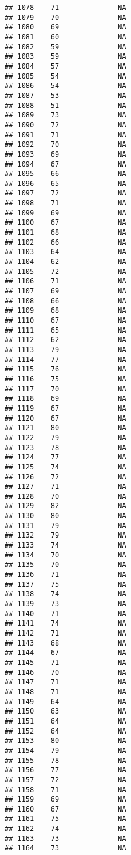 \documentclass[]{article}
\begin{document}
\begin{verbatim}
## 1078    71              NA
## 1079    70              NA
## 1080    69              NA
## 1081    60              NA
## 1082    59              NA
## 1083    59              NA
## 1084    57              NA
## 1085    54              NA
## 1086    54              NA
## 1087    53              NA
## 1088    51              NA
## 1089    73              NA
## 1090    72              NA
## 1091    71              NA
## 1092    70              NA
## 1093    69              NA
## 1094    67              NA
## 1095    66              NA
## 1096    65              NA
## 1097    72              NA
## 1098    71              NA
## 1099    69              NA
## 1100    67              NA
## 1101    68              NA
## 1102    66              NA
## 1103    64              NA
## 1104    62              NA
## 1105    72              NA
## 1106    71              NA
## 1107    69              NA
## 1108    66              NA
## 1109    68              NA
## 1110    67              NA
## 1111    65              NA
## 1112    62              NA
## 1113    79              NA
## 1114    77              NA
## 1115    76              NA
## 1116    75              NA
## 1117    70              NA
## 1118    69              NA
## 1119    67              NA
## 1120    67              NA
## 1121    80              NA
## 1122    79              NA
## 1123    78              NA
## 1124    77              NA
## 1125    74              NA
## 1126    72              NA
## 1127    71              NA
## 1128    70              NA
## 1129    82              NA
## 1130    80              NA
## 1131    79              NA
## 1132    79              NA
## 1133    74              NA
## 1134    70              NA
## 1135    70              NA
## 1136    71              NA
## 1137    75              NA
## 1138    74              NA
## 1139    73              NA
## 1140    71              NA
## 1141    74              NA
## 1142    71              NA
## 1143    68              NA
## 1144    67              NA
## 1145    71              NA
## 1146    70              NA
## 1147    71              NA
## 1148    71              NA
## 1149    64              NA
## 1150    63              NA
## 1151    64              NA
## 1152    64              NA
## 1153    80              NA
## 1154    79              NA
## 1155    78              NA
## 1156    77              NA
## 1157    72              NA
## 1158    71              NA
## 1159    69              NA
## 1160    67              NA
## 1161    75              NA
## 1162    74              NA
## 1163    73              NA
## 1164    73              NA

\end{verbatim}
\end{document}
